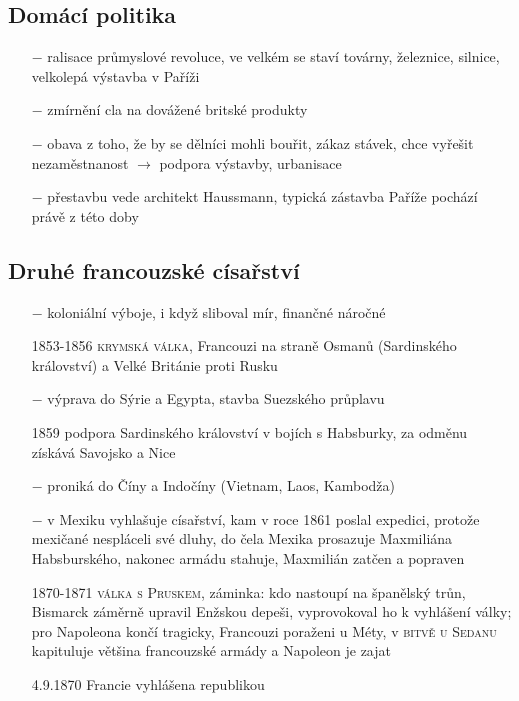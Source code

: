 \documentclass{article}
\begin{document}
\subsection*{Domácí politika}
\begin{itemize}
    \vspace{-0.5em}
    \setlength\itemsep{0.15em}
    \item[$-$] ralisace průmyslové revoluce, ve velkém se staví továrny, železnice, silnice, velkolepá výstavba v Paříži
    \item[$-$] zmírnění cla na dovážené britské produkty
    \item[$-$] obava z toho, že by se dělníci mohli bouřit, zákaz stávek, chce vyřešit nezaměstnanost $\rightarrow$ podpora výstavby, urbanisace
    \item[$-$] přestavbu vede architekt Haussmann, typická zástavba Paříže pochází právě z této doby
\end{itemize}

\subsection*{Druhé francouzské císařství}
\begin{itemize}
    \vspace{-0.5em}
    \setlength\itemsep{0.15em}
    \item[$-$] koloniální výboje, i když sliboval mír, finančné náročné
    \item[1853-1856] \textsc{krymská válka}, Francouzi na straně Osmanů (Sardinského království) a Velké Británie proti Rusku
    \item[$-$] výprava do Sýrie a Egypta, stavba Suezského průplavu
    \item[1859] podpora Sardinského království v bojích s Habsburky, za odměnu získává Savojsko a Nice
    \item[$-$] proniká do Číny a Indočíny (Vietnam, Laos, Kambodža)
    \item[$-$] v Mexiku vyhlašuje císařství, kam v roce 1861 poslal expedici, protože mexičané nespláceli své dluhy, do čela Mexika prosazuje Maxmiliána Habsburského, nakonec armádu stahuje, Maxmilián zatčen a popraven
    \item[1870-1871] \textsc{válka s Pruskem}, záminka: kdo nastoupí na španělský trůn, Bismarck záměrně upravil Enžskou depeši, vyprovokoval ho k vyhlášení války; pro Napoleona končí tragicky, Francouzi poraženi u Méty, v \textsc{bitvě u Sedanu} kapituluje většina francouzské armády a Napoleon je zajat
    \item[4.9.1870] Francie vyhlášena republikou
\end{itemize}
\end{document}
